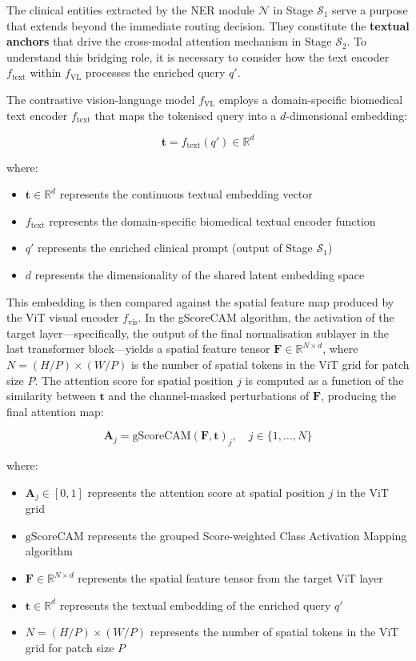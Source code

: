 The clinical entities extracted by the NER module $\mathcal{N}$ in Stage $\mathcal{S}_1$ serve a purpose that extends beyond the immediate routing decision. They constitute the \textbf{textual anchors} that drive the cross-modal attention mechanism in Stage $\mathcal{S}_2$. To understand this bridging role, it is necessary to consider how the text encoder $f_{\text{text}}$ within $f_{\text{VL}}$ processes the enriched query $q'$.

The contrastive vision-language model $f_{\text{VL}}$ employs a domain-specific biomedical text encoder $f_{\text{text}}$ that maps the tokenised query into a $d$-dimensional embedding:

\[
\mathbf{t} = f_{\text{text}}(q') \in \mathbb{R}^d
\]

where:
\begin{itemize}
\item $\mathbf{t} \in \mathbb{R}^d$ represents the continuous textual embedding vector
\item $f_{\text{text}}$ represents the domain-specific biomedical textual encoder function
\item $q'$ represents the enriched clinical prompt (output of Stage $\mathcal{S}_1$)
\item $d$ represents the dimensionality of the shared latent embedding space
\end{itemize}

This embedding is then compared against the spatial feature map produced by the ViT visual encoder $f_{\text{vis}}$. In the gScoreCAM algorithm, the activation of the target layer---specifically, the output of the final normalisation sublayer in the last transformer block---yields a spatial feature tensor $\mathbf{F} \in \mathbb{R}^{N \times d}$, where $N = (H/P) \times (W/P)$ is the number of spatial tokens in the ViT grid for patch size $P$. The attention score for spatial position $j$ is computed as a function of the similarity between $\mathbf{t}$ and the channel-masked perturbations of $\mathbf{F}$, producing the final attention map:

\[
\mathbf{A}_{j} = \text{gScoreCAM}(\mathbf{F}, \mathbf{t})_j, \quad j \in \{1, \ldots, N\}
\]

where:
\begin{itemize}
\item $\mathbf{A}_{j} \in [0,1]$ represents the attention score at spatial position $j$ in the ViT grid
\item $\text{gScoreCAM}$ represents the grouped Score-weighted Class Activation Mapping algorithm
\item $\mathbf{F} \in \mathbb{R}^{N \times d}$ represents the spatial feature tensor from the target ViT layer
\item $\mathbf{t} \in \mathbb{R}^d$ represents the textual embedding of the enriched query $q'$
\item $N = (H/P) \times (W/P)$ represents the number of spatial tokens in the ViT grid for patch size $P$
\end{itemize}

